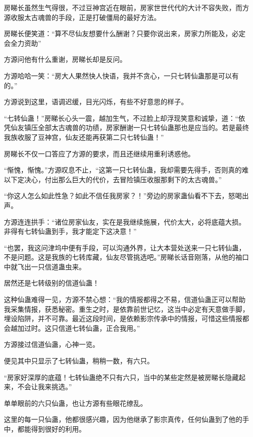 
\begin{this_body}

房睇长虽然生气得很，不过豆神宫近在眼前，房家世世代代的大计不容失败，而方源收服太古魂兽的手段，正是打破僵局的最好方法。

房睇长便笑道：“算不尽仙友想要什么酬谢？只要你说出来，房家力所能及，必定会全力资助”

方源问他有什么重谢，房睇长却是反问。

方源哈哈一笑：“房大人果然快人快语，我并不贪心，一只七转仙蛊那是可以有的。”

方源说到这里，语调迟缓，目光闪烁，有些不好意思的样子。

“七转仙蛊！”房睇长心头一震，越加生气，不过脸上却浮现笑意和诚挚，道：“依凭仙友镇压全部太古魂兽的功绩，房家酬谢一只七转仙蛊那也是应当的。若是最终我族收服了豆神宫，仙友还能再获第二只七转仙蛊！”

房睇长不仅一口答应了方源的要求，而且还继续用重利诱惑他。

“惭愧，惭愧。”方源叹息不止，“这第一只七转仙蛊，我却需要先得手，否则真的难以下定决心，付出那么巨大的代价，去冒险镇压收服那剩下的太古魂兽。”

“你这人怎么如此性急？如此不信任我房家？！”旁边的房家蛊仙看不下去，怒喝出声。

方源连连拱手：“诸位房家仙友，实在是我继续施展，代价太大，必将底蕴大损。非得有七转仙蛊到手，我才能定下这决意！”

“也罢，我这问津坞中便有手段，可以沟通外界，让大本营处送来一只七转仙蛊，不是问题。这是我族的七转库藏，仙友尽管挑选吧。”房睇长话音刚落，从他的袖口中就飞出一只信道蛊虫来。

居然还是七转级别的信道仙蛊！

这种仙蛊难得一见，方源不禁心想：“我的情报都得之不易，信道仙蛊正可以帮助我采集情报，获悉秘密。重生之时，是依靠前世记忆，这当中必定有天意做手脚，埋设陷阱，并不可靠。最近这段时间，是依赖影宗传承中的情报，可惜这些情报都会越加过时。这只信道七转仙蛊，正合我用。”

方源接过信道仙蛊，心神一览。

便见其中只显示了七转仙蛊，稍稍一数，有六只。

“房家好深厚的底蕴！七转仙蛊绝不只有六只，当中的某些定然是被房睇长隐藏起来，不会让我来挑选。”

单单眼前的六只仙蛊，也让方源有些眼花缭乱。

这里的每一只仙蛊，他都很感兴趣，因为他继承了影宗真传，任何仙蛊到了他的手中，都能得到很好的利用。


\end{this_body}
